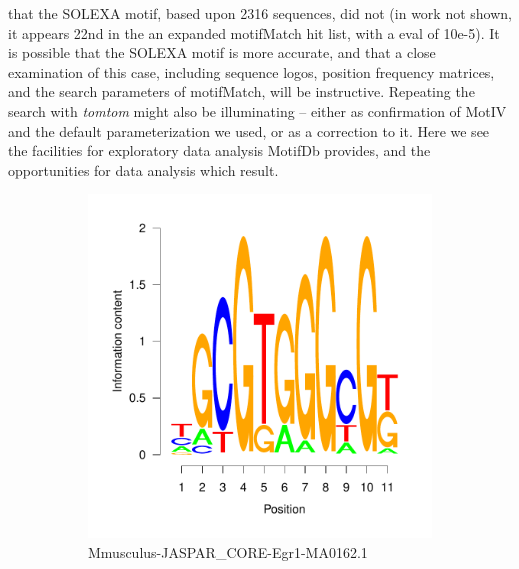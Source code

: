 \documentclass{article}
\begin{document}
that the SOLEXA motif, based upon 2316 sequences, did not (in work not shown, it appears 22nd in the an expanded
motifMatch hit list, with a eval of 10e-5).  It is possible that the SOLEXA motif is more accurate, and that a close
examination of this case, including sequence logos, position frequency matrices, and the search parameters of
motifMatch, will be instructive.  Repeating the search with \emph{tomtom} might also be illuminating -- either as
confirmation of MotIV and the default parameterization we used, or as a correction to it.  Here we see the facilities
for exploratory data analysis MotifDb provides, and the opportunities for data analysis which result.








\begin{figure}[htpb!]
  \centering
  \begin{subfigure}[b]{0.38\textwidth}
    \includegraphics[width=\textwidth]{MotifDb-logo1}
    \caption{Mmusculus-JASPAR\_CORE-Egr1-MA0162.1}
    \label{fig:Egr1-MA0162.1}
    \end{subfigure}%
  \begin{subfigure}[b]{0.38\textwidth}

\end{subfigure}
\end{figure}
\end{document}

